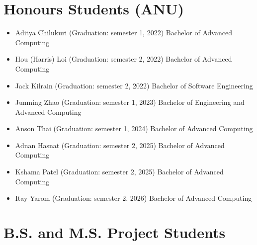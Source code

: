 \documentclass[singlecolumn,singlespace,11pt]{article}
\begin{document}
\section*{Honours Students (ANU)}

\begin{itemize}

\item Aditya Chilukuri (Graduation: semester 1, 2022) Bachelor of Advanced Computing 
\item Hou (Harris) Loi (Graduation: semester 2, 2022) Bachelor of Advanced Computing 
\item Jack Kilrain (Graduation: semester 2, 2022) Bachelor of Software Engineering 
\item Junming Zhao (Graduation: semester 1, 2023) Bachelor of Engineering and Advanced Computing 
\item Anson Thai (Graduation: semester 1, 2024) Bachelor of Advanced Computing
\item Adnan Hasnat (Graduation: semester 2, 2025) Bachelor of Advanced Computing
\item Kshama Patel (Graduation: semester 2, 2025) Bachelor of Advanced Computing
\item Itay Yarom (Graduation: semester 2, 2026) Bachelor of Advanced Computing

\end{itemize}

\section*{B.S. and M.S. Project Students}
\end{document}
